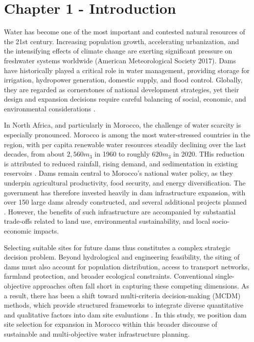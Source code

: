 \section{Chapter 1 - Introduction}\label{sec:introduction}
Water has become one of the most important and contested natural resources of the 21st century. Increasing population growth, accelerating urbanization, and the intensifying effects of climate change are exerting significant pressure on freshwater systems worldwide (American Meteorological Society 2017)\cite{AMS2017}. Dams have historically played a critical role in water management, providing storage for irrigation, hydropower generation, domestic supply, and flood control. Globally, they are regarded as cornerstones of national development strategies, yet their design and expansion decisions require careful balancing of social, economic, and environmental considerations \cite{Schmitt2024,AMS2017}.    

In North Africa, and particularly in Morocco, the challenge of water scarcity is especially pronounced. Morocco is among the most water-stressed countries in the region, with per capita renewable water resources steadily declining over the last decades, from about $2,560m_3$ in 1960 to roughly $620m_3$ in 2020. THis reduction is attributed to reduced rainfall, rising demand, and sedimentation in existing reservoirs \cite{WorldBank2023}. Dams remain central to Morocco's national water policy, as they underpin agricultural productivity, food security, and energy diversification. The government has therefore invested heavily in dam infrastructure expansion, with over 150 large dams already constructed, and several additional projects planned \cite{TradeGov2024}. However, the benefits of such infrastructure are accompanied by substantial trade-offs related to land use, environmental sustainability, and local socio-economic impacts.

Selecting suitable sites for future dams thus constitutes a complex strategic decision problem. Beyond hydrological and engineering feasibility, the siting of dams must also account for population distribution, access to transport networks, farmland protection, and broader ecological constraints. Conventional single-objective approaches often fall short in capturing these competing dimensions. As a result, there has been a shift toward multi-criteria decision-making (MCDM) methods, which provide structured frameworks to integrate diverse quantitative and qualitative factors into dam site evaluations \cite{TradeGov2024,Minatour2015}. In this study, we position dam site selection  for expansion in Morocco within this broader discourse of sustainable and multi-objective water infrastructure planning.

